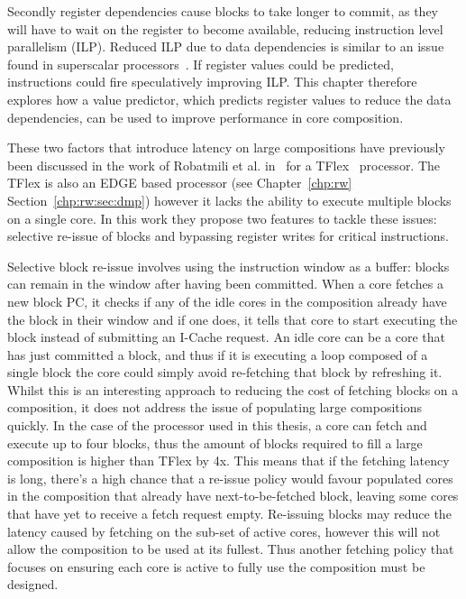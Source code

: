 Secondly register dependencies cause blocks to take longer to commit, as they will have to wait on the register to become available, reducing instruction level parallelism (ILP).
Reduced ILP due to data dependencies is similar to an issue found in superscalar processors~\cite{peraisBeBop2015}.
If register values could be predicted, instructions could fire speculatively improving ILP.
This chapter therefore explores how a value predictor, which predicts register values to reduce the data dependencies, can be used to improve performance in core composition.

These two factors that introduce latency on large compositions have previously been discussed in the work of Robatmili et al. in~\cite{robatmili2011uniproc} for a TFlex~\cite{kim2007tflex} processor.
The TFlex is also an EDGE based processor (see Chapter~\ref{chp:rw} Section~\ref{chp:rw:sec:dmp}) however it lacks the ability to execute multiple blocks on a single core.
In this work they propose two features to tackle these issues: selective re-issue of blocks and bypassing register writes for critical instructions.

Selective block re-issue involves using the instruction window as a buffer: blocks can remain in the window after having been committed.
When a core fetches a new block PC, it checks if any of the idle cores in the composition already have the block in their window and if one does, it tells that core to start executing the block instead of submitting an I-Cache request.
An idle core can be a core that has just committed a block, and thus if it is executing a loop composed of a single block the core could simply avoid re-fetching that block by refreshing it.
Whilst this is an interesting approach to reducing the cost of fetching blocks on a composition, it does not address the issue of populating large compositions quickly.
In the case of the processor used in this thesis, a core can fetch and execute up to four blocks, thus the amount of blocks required to fill a large composition is higher than TFlex by 4x.
This means that if the fetching latency is long, there's a high chance that a re-issue policy would favour populated cores in the composition that already have next-to-be-fetched block, leaving some cores that have yet to receive a fetch request empty.
Re-issuing blocks may reduce the latency caused by fetching on the sub-set of active cores, however this will not allow the composition to be used at its fullest.
Thus another fetching policy that focuses on ensuring each core is active to fully use the composition must be designed.

